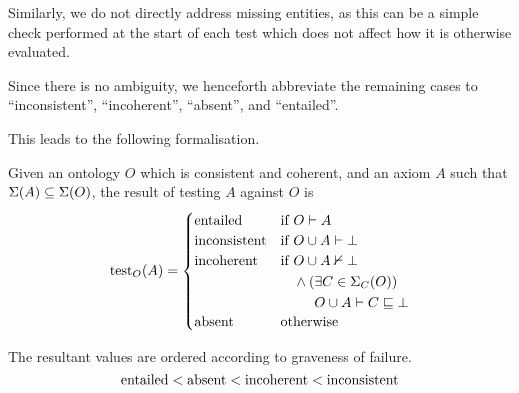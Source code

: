 \documentclass[paper.tex]{subfiles}
\begin{document}
Similarly, we do not directly address missing entities, as this can be a simple check performed at the start of each test which does not affect how it is otherwise evaluated.

Since there is no ambiguity, we henceforth abbreviate the remaining cases to ``inconsistent'', ``incoherent'', ``absent'', and ``entailed''.

This leads to the following formalisation.

\begin{definition}
  Given an ontology $O$ which is consistent and coherent, and an axiom $A$ such that $\Sigma(A) \subseteq \Sigma(O)$, the result of testing $A$ against $O$ is
  \[
    \test_O(A) =
    \begin{cases}
      \entailed &
        \text{if } O \sementails A \\
      \inconsistent &
        \text{if } O \union A \sementails \bot \\
      \incoherent &
        \text{if }
        \! \begin{aligned}[t]
          & O \union A \nsementails \bot \\
          & \land (\exists C \in \signatureC(O)) \\
          & \phantom{{}\land (} O \union A \sementails C \sqsubseteq \bot
        \end{aligned} \\
      \absent &
        \text {otherwise} \\
    \end{cases}
  \]

  The resultant values are ordered according to graveness of failure.
  \[ \mathrm{entailed} < \mathrm{absent} < \mathrm{incoherent} < \mathrm{inconsistent} \]
\end{definition}
\end{document}
